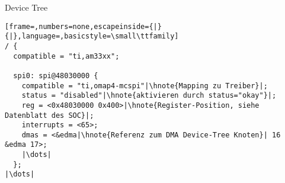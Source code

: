 \begin{frame}[fragile]{Device Tree}
	\begin{lstlisting}[frame=,numbers=none,escapeinside={|}{|},language=,basicstyle=\small\ttfamily]
/ {
  compatible = "ti,am33xx";

  spi0: spi@48030000 {
    compatible = "ti,omap4-mcspi"|\hnote{Mapping zu Treiber}|;
    status = "disabled"|\hnote{aktivieren durch status="okay"}|;
    reg = <0x48030000 0x400>|\hnote{Register-Position, siehe Datenblatt des SOC}|;
    interrupts = <65>;
    dmas = <&edma|\hnote{Referenz zum DMA Device-Tree Knoten}| 16 &edma 17>;
    |\dots|
  };
|\dots|
	\end{lstlisting}
\end{frame}

